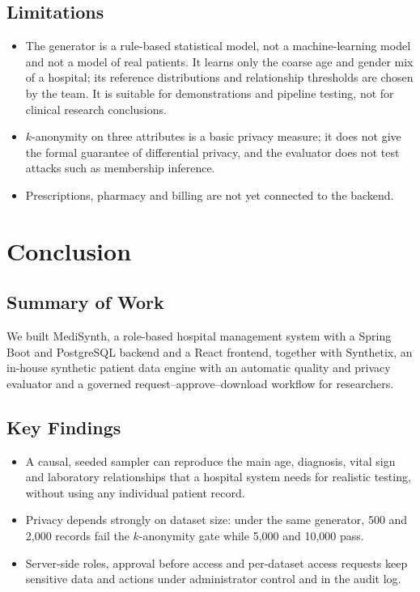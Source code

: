 \documentclass{tietreport}
\begin{document}
\section{Limitations}

\begin{itemize}
  \item The generator is a rule-based statistical model, not a machine-learning
    model and not a model of real patients. It learns only the coarse age and
    gender mix of a hospital; its reference distributions and relationship
    thresholds are chosen by the team. It is suitable for demonstrations and
    pipeline testing, not for clinical research conclusions.
  \item $k$-anonymity on three attributes is a basic privacy measure; it does
    not give the formal guarantee of differential privacy, and the evaluator
    does not test attacks such as membership inference.
  \item Prescriptions, pharmacy and billing are not yet connected to the
    backend.
\end{itemize}


\chapter{Conclusion}

\section{Summary of Work}

We built MediSynth, a role-based hospital management system with a
Spring Boot and PostgreSQL backend and a React frontend, together with
Synthetix, an in-house synthetic patient data engine with an automatic quality
and privacy evaluator and a governed request--approve--download workflow for
researchers.

\section{Key Findings}

\begin{itemize}
  \item A causal, seeded sampler can reproduce the main age, diagnosis, vital
    sign and laboratory relationships that a hospital system needs for
    realistic testing, without using any individual patient record.
  \item Privacy depends strongly on dataset size: under the same generator,
    500 and 2,000 records fail the $k$-anonymity gate while 5,000 and 10,000
    pass.
  \item Server-side roles, approval before access and per-dataset access
    requests keep sensitive data and actions under administrator control and
    in the audit log.
\end{itemize}
\end{document}
